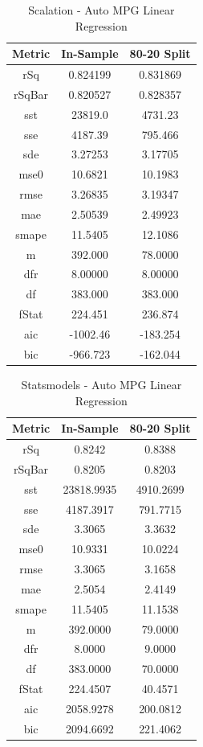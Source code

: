 \documentclass{article}
\begin{document}
\begin{table}[H]
\centering
\caption{Scalation - Auto MPG Linear Regression}
\label{tab:Scalation - Auto MPG Linear Regression}
\begin{tabular}{|c|c|c|} \hline 
Metric & In-Sample & 80-20 Split \\ \hline \hline 
rSq &0.824199 & 0.831869 \\ \hline 
rSqBar &0.820527 &      0.828357 \\ \hline 
sst &23819.0 &  4731.23 \\ \hline 
sse &4187.39 &  795.466 \\ \hline 
sde &3.27253 &  3.17705 \\ \hline 
mse0 &10.6821 & 10.1983 \\ \hline 
rmse &3.26835 & 3.19347 \\ \hline 
mae &2.50539 &  2.49923 \\ \hline 
smape &11.5405 &        12.1086 \\ \hline 
m &392.000 &    78.0000 \\ \hline 
dfr &8.00000 &  8.00000 \\ \hline 
df &383.000 &   383.000 \\ \hline 
fStat &224.451 &        236.874 \\ \hline 
aic &-1002.46 & -183.254 \\ \hline 
bic &-966.723 & -162.044 \\ \hline 
\end{tabular}
\end{table}

\begin{table}[H]
\centering
\caption{Statsmodels - Auto MPG Linear Regression}
\label{tab:Statsmodels - Auto MPG Linear Regression}
\begin{tabular}{|c|c|c|}\hline
Metric & In-Sample & 80-20 Split \\ \hline \hline
rSq & 0.8242 & 0.8388 \\ \hline
rSqBar & 0.8205 & 0.8203 \\ \hline
sst & 23818.9935 & 4910.2699 \\ \hline
sse & 4187.3917 & 791.7715 \\ \hline
sde & 3.3065 & 3.3632 \\ \hline
mse0 & 10.9331 & 10.0224 \\ \hline
rmse & 3.3065 & 3.1658 \\ \hline
mae & 2.5054 & 2.4149 \\ \hline
smape & 11.5405 & 11.1538 \\ \hline
m & 392.0000 & 79.0000 \\ \hline
dfr & 8.0000 & 9.0000 \\ \hline
df & 383.0000 & 70.0000 \\ \hline
fStat & 224.4507 & 40.4571 \\ \hline
aic & 2058.9278 & 200.0812 \\ \hline
bic & 2094.6692 & 221.4062 \\ \hline
\end{tabular}
\end{table}
\end{document}
